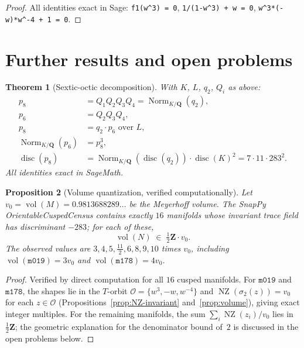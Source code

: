 \documentclass[12pt]{amsart}
\newtheorem{theorem}{Theorem}[section]
\newtheorem{proposition}[theorem]{Proposition}
\theoremstyle{definition}
\newcommand{\QQ}{\mathbf{Q}}
\newcommand{\ZZ}{\mathbf{Z}}
\DeclareMathOperator{\Norm}{Norm}
\DeclareMathOperator{\disc}{disc}
\DeclareMathOperator{\vol}{vol}
\DeclareMathOperator{\NZ}{NZ}
\newcommand{\mzero}{\texttt{m019}}
\newcommand{\mone}{\texttt{m178}}
\begin{document}
\begin{proof}
All identities exact in Sage: \texttt{f1(w\^{}3) = 0},
\texttt{1/(1-w\^{}3) + w = 0}, \texttt{w\^{}3*(-w)*w\^{}-4 + 1 = 0}.
\end{proof}

\section{Further results and open problems}

\begin{theorem}[Sextic-octic decomposition]\label{thm:main}
With $K$, $L$, $q_2$, $Q_i$ as above:
\begin{align}
  p_8 &= Q_1 Q_2 Q_3 Q_4 = \Norm_{K/\QQ}(q_2),\\
  p_6 &= Q_2 Q_3 Q_4,\\
  p_8 &= q_2 \cdot p_6 \text{ over } L,\\
  \Norm_{K/\QQ}(p_6) &= p_8^3,\\
  \disc(p_8) &= \Norm_{K/\QQ}(\disc(q_2)) \cdot \disc(K)^2
               = 7 \cdot 11 \cdot 283^2.
\end{align}
All identities exact in SageMath.
\end{theorem}

\begin{proposition}[Volume quantization, verified computationally]
\label{prop:vol-quantum}
Let $v_0 = \vol(M) = 0.9813688289\ldots$ be the Meyerhoff volume.
The SnapPy OrientableCuspedCensus contains exactly $16$ manifolds
whose invariant trace field has discriminant $-283$; for each of these,
\[
  \vol(N) \;\in\; \tfrac{1}{2}\ZZ \cdot v_0.
\]
The observed values are
$3, 4, 5, \tfrac{11}{2}, 6, 8, 9, 10$ times $v_0$, including
$\vol(\mzero) = 3v_0$ and $\vol(\mone) = 4v_0$.
\end{proposition}

\begin{proof}
Verified by direct computation for all $16$ cusped manifolds.
For $\mzero$ and $\mone$, the shapes lie in the $T$-orbit
$\mathcal{O} = \{w^3, -w, w^{-4}\}$ and
$\NZ(\sigma_2(z)) = v_0$ for each $z \in \mathcal{O}$
(Propositions~\ref{prop:NZ-invariant} and~\ref{prop:volume}),
giving exact integer multiples.
For the remaining manifolds, the sum $\sum_i \NZ(z_i)/v_0$
lies in $\tfrac{1}{2}\ZZ$; the geometric explanation for the
denominator bound of~$2$ is discussed in the open problems below.
\end{proof}
\end{document}

